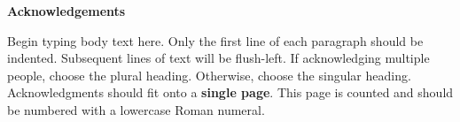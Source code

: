 
\begin{center}
\textbf{Acknowledgements}
\end{center}

Begin typing body text here. Only the first line of each paragraph should be indented. Subsequent lines of text will be flush-left. If acknowledging multiple people, choose the plural heading. Otherwise, choose the singular heading. Acknowledgments should fit onto a \textbf{single page}. This page is counted and should be numbered with a lowercase Roman numeral.  

\newpage